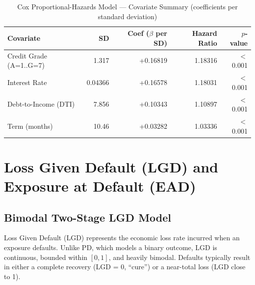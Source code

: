 \documentclass[11pt,a4paper]{article}
\begin{document}
\begin{table}[H]
\centering
\caption{Cox Proportional-Hazards Model --- Covariate Summary (coefficients per standard deviation)}
\label{tab:cox_summary}
\vspace{0.5em}
\begin{tabular}{lrrrr}
\toprule
\textbf{Covariate} & \textbf{SD} & \textbf{Coef ($\beta$ per SD)} & \textbf{Hazard Ratio} & \textbf{$p$-value} \\
\midrule
Credit Grade (A=1..G=7) & 1.317 & +0.16819 & 1.18316 & $<$0.001 \\
Interest Rate & 0.04366 & +0.16578 & 1.18031 & $<$0.001 \\
Debt-to-Income (DTI) & 7.856 & +0.10343 & 1.10897 & $<$0.001 \\
Term (months) & 10.46 & +0.03282 & 1.03336 & $<$0.001 \\
\bottomrule
\end{tabular}
\end{table}

\section{Loss Given Default (LGD) and Exposure at Default (EAD)}

\subsection{Bimodal Two-Stage LGD Model}
Loss Given Default (LGD) represents the economic loss rate incurred when an exposure defaults. Unlike PD, which models a binary outcome, LGD is continuous, bounded within $[0, 1]$, and heavily bimodal. Defaults typically result in either a complete recovery (LGD = 0, ``cure'') or a near-total loss (LGD close to 1).
\end{document}
